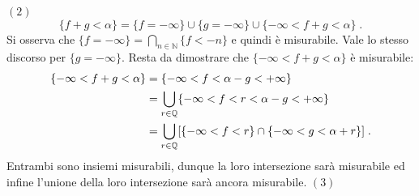 \documentclass[a4paper,12pt]{report}
\theoremstyle{plain}
\theoremstyle{definition}
\theoremstyle{remark}
\numberwithin{equation}{section}
\begin{document}
\proof $(2)$ \\

\begin{equation}
\{f+g<\alpha\}=\{f=-\infty\}\cup\{g=-\infty\}\cup\{-\infty<f+g<\alpha\}\;.
\end{equation}
Si osserva che $\{f=-\infty\}=\bigcap_{n\in\mathbb{N}}\{f<-n\}$ e quindi è misurabile. Vale lo stesso discorso per $\{g=-\infty\}$. Resta 
da dimostrare che $\{-\infty<f+g<\alpha\}$ è misurabile:
\begin{align}
\{-\infty<f+g<\alpha\} &=\{-\infty<f<\alpha-g<+\infty\} \notag \\
&=\bigcup_{r\in\mathbb{Q}}\{-\infty<f<r<\alpha-g<+\infty\} \notag \\
&=\bigcup_{r\in\mathbb{Q}} [\{-\infty<f<r\}\cap\{-\infty<g<\alpha+r\}]\;.
\end{align}
Entrambi sono insiemi misurabili, dunque la loro intersezione sarà misurabile ed infine l'unione della loro intersezione sarà ancora 
misurabile.
\endproof
\proof $(3)$ \\
\end{document}
